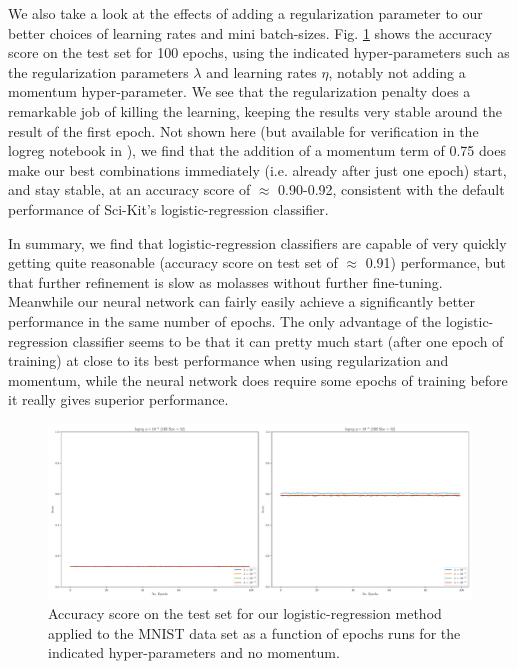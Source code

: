 \documentclass[reprint, english, nofootinbib]{revtex4-2}
\begin{document}
We also take a look at the effects of adding a regularization parameter to our better choices of learning rates and mini batch-sizes. Fig. \ref{fig:logreg_regularization} shows the accuracy score on the test set for 100 epochs, using the indicated hyper-parameters such as the regularization parameters $\lambda$ and learning rates $\eta$, notably not adding a momentum hyper-parameter. We see that the regularization penalty does a remarkable job of killing the learning, keeping the results very stable around the result of the first epoch. Not shown here (but available for verification in the logreg notebook in \cite{4155_repo}), we find that the addition of a momentum term of 0.75 does make our best combinations immediately (i.e. already after just one epoch) start, and stay stable, at an accuracy score of $\approx$ 0.90-0.92, consistent with the default performance of Sci-Kit's logistic-regression classifier.

In summary, we find that logistic-regression classifiers are capable of very quickly getting quite reasonable (accuracy score on test set of $\approx$ 0.91) performance, but that further refinement is slow as molasses without further fine-tuning. Meanwhile our neural network can fairly easily achieve a significantly better performance in the same number of epochs. The only advantage of the logistic-regression classifier seems to be that it can pretty much start (after one epoch of training) at close to its best performance when using regularization and momentum, while the neural network does require some epochs of training before it really gives superior performance.
\begin{figure}
    \includegraphics[width=\columnwidth]{logreg_regularization.pdf}
    \caption{\label{fig:logreg_regularization}Accuracy score on the test set for our logistic-regression method applied to the MNIST data set as a function of epochs runs for the indicated hyper-parameters and no momentum.}
\end{figure}
\end{document}
